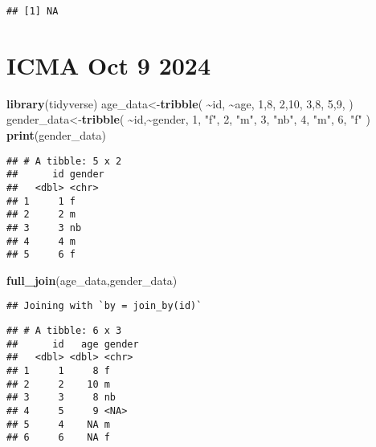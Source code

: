\documentclass[
]{article}
\newenvironment{Shaded}{\begin{snugshade}}{\end{snugshade}}
\newcommand{\DecValTok}[1]{\textcolor[rgb]{0.00,0.00,0.81}{#1}}
\newcommand{\FunctionTok}[1]{\textcolor[rgb]{0.13,0.29,0.53}{\textbf{#1}}}
\newcommand{\NormalTok}[1]{#1}
\newcommand{\OtherTok}[1]{\textcolor[rgb]{0.56,0.35,0.01}{#1}}
\newcommand{\SpecialCharTok}[1]{\textcolor[rgb]{0.81,0.36,0.00}{\textbf{#1}}}
\newcommand{\StringTok}[1]{\textcolor[rgb]{0.31,0.60,0.02}{#1}}
\begin{document}
\begin{verbatim}
## [1] NA
\end{verbatim}

\section{ICMA Oct 9 2024}\label{icma-oct-9-2024}

\begin{Shaded}
\begin{Highlighting}[]
\FunctionTok{library}\NormalTok{(tidyverse)}
\NormalTok{age\_data}\OtherTok{\textless{}{-}}\FunctionTok{tribble}\NormalTok{(}
  \SpecialCharTok{\textasciitilde{}}\NormalTok{id, }\SpecialCharTok{\textasciitilde{}}\NormalTok{age,}
  \DecValTok{1}\NormalTok{,}\DecValTok{8}\NormalTok{,}
  \DecValTok{2}\NormalTok{,}\DecValTok{10}\NormalTok{,}
  \DecValTok{3}\NormalTok{,}\DecValTok{8}\NormalTok{,}
  \DecValTok{5}\NormalTok{,}\DecValTok{9}\NormalTok{,}
\NormalTok{)}
\NormalTok{gender\_data}\OtherTok{\textless{}{-}}\FunctionTok{tribble}\NormalTok{(}
  \SpecialCharTok{\textasciitilde{}}\NormalTok{id,}\SpecialCharTok{\textasciitilde{}}\NormalTok{gender,}
  \DecValTok{1}\NormalTok{, }\StringTok{"f"}\NormalTok{,}
  \DecValTok{2}\NormalTok{, }\StringTok{"m"}\NormalTok{,}
  \DecValTok{3}\NormalTok{, }\StringTok{"nb"}\NormalTok{,}
  \DecValTok{4}\NormalTok{, }\StringTok{"m"}\NormalTok{,}
  \DecValTok{6}\NormalTok{, }\StringTok{"f"}
\NormalTok{)}
\FunctionTok{print}\NormalTok{(gender\_data)}
\end{Highlighting}
\end{Shaded}

\begin{verbatim}
## # A tibble: 5 x 2
##      id gender
##   <dbl> <chr> 
## 1     1 f     
## 2     2 m     
## 3     3 nb    
## 4     4 m     
## 5     6 f
\end{verbatim}

\begin{Shaded}
\begin{Highlighting}[]
\FunctionTok{full\_join}\NormalTok{(age\_data,gender\_data)}
\end{Highlighting}
\end{Shaded}

\begin{verbatim}
## Joining with `by = join_by(id)`
\end{verbatim}

\begin{verbatim}
## # A tibble: 6 x 3
##      id   age gender
##   <dbl> <dbl> <chr> 
## 1     1     8 f     
## 2     2    10 m     
## 3     3     8 nb    
## 4     5     9 <NA>  
## 5     4    NA m     
## 6     6    NA f
\end{verbatim}
\end{document}
